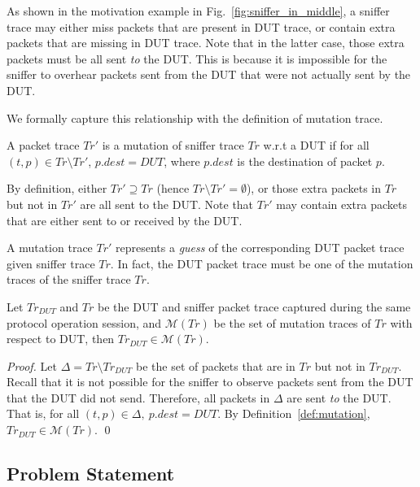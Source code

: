 As shown in the motivation example in Fig.~\ref{fig:sniffer_in_middle}, a
sniffer trace may either miss packets that are present in DUT trace, or contain
extra packets that are missing in DUT trace. Note that in the latter case, those
extra packets must be all sent \textit{to} the DUT. This is because it is
impossible for the sniffer to overhear packets sent from the DUT that were not
actually sent by the DUT.

We formally capture this relationship with the definition of mutation trace.

\begin{definition}
  \label{def:mutation}
  A packet trace $Tr'$ is a mutation of sniffer trace $Tr$ w.r.t a DUT if for
  all $(t, p) \in Tr \setminus Tr'$, $p.dest = DUT$, where $p.dest$ is the
  destination of packet $p$.
\end{definition}

By definition, either $Tr' \supseteq Tr$ (hence $Tr \setminus Tr' = \emptyset$),
or those extra packets in $Tr$ but not in $Tr'$ are all sent to the DUT. Note
that $Tr'$ may contain extra packets that are either sent to or received by
the DUT.

A mutation trace $Tr'$ represents a \textit{guess} of the corresponding DUT
packet trace given sniffer trace $Tr$.  In fact, the DUT packet trace must
be one of the mutation traces of the sniffer trace $Tr$.

\begin{lemma}
  Let $Tr_{DUT}$ and $Tr$ be the DUT and sniffer packet trace captured during
  the same protocol operation session, and $\mathcal{M}(Tr)$ be the set of
  mutation traces of $Tr$ with respect to DUT, then $Tr_{DUT} \in \mathcal{M}(Tr)$.
  \label{lem:mutation}
\end{lemma}%
\begin{proof}
  Let $\Delta = Tr \setminus Tr_{DUT}$ be the set of packets that are in $Tr$
  but not in $Tr_{DUT}$. Recall that it is not possible for the sniffer to
  observe packets sent from the DUT that the DUT did not send. Therefore,
  all packets in $\Delta$ are sent \textit{to} the DUT. That is, for
  all $(t, p) \in \Delta,\ p.dest = DUT$. By Definition~\ref{def:mutation},
  $Tr_{DUT} \in \mathcal{M}(Tr)$.
  \qed
\end{proof}


\subsection{Problem Statement}
\label{subsec:problem}

